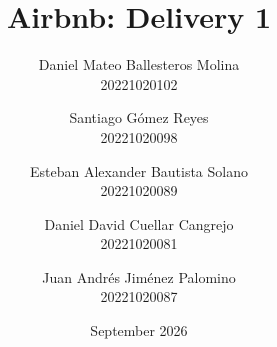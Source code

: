 \documentclass[12pt,a4paper]{article}
\begin{document}
\title{Airbnb: Delivery 1}
\author{Daniel Mateo Ballesteros Molina \\ 20221020102
\and Santiago Gómez Reyes \\ 20221020098
\and Esteban Alexander Bautista Solano \\ 20221020089
\and Daniel David Cuellar Cangrejo \\ 20221020081
\and Juan Andrés Jiménez Palomino \\ 20221020087}
\date{September 2026}

\maketitle

\tableofcontents













\printbibliography
\end{document}
